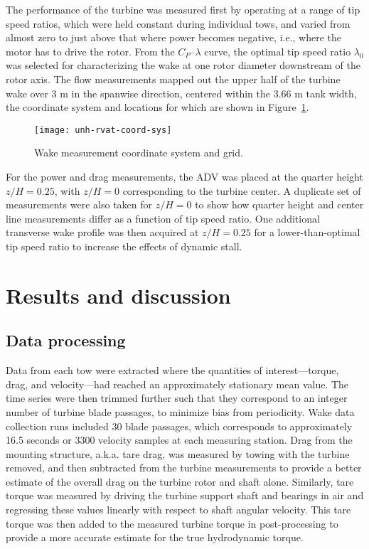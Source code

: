 
The performance of the turbine was measured first by operating at a range of tip
speed ratios, which were held constant during individual tows, and varied from
almost zero to just above that where power becomes negative, i.e., where the
motor has to drive the rotor. From the $C_P$--$\lambda$ curve, the optimal tip
speed ratio $\lambda_0$ was selected for characterizing the wake at one rotor
diameter downstream of the rotor axis. The flow measurements mapped out the
upper half of the turbine wake over 3 m in the spanwise direction, centered
within the 3.66 m tank width, the coordinate system and locations for which are
shown in Figure~\ref{fig:RVAT-baseline-wake-coordinates}.

\begin{figure}
    \centering

    \texttt{[image: unh-rvat-coord-sys]}

    \caption{Wake measurement coordinate system and grid.}

    \label{fig:RVAT-baseline-wake-coordinates}
\end{figure}

For the power and drag measurements, the ADV was placed at the quarter height
$z/H = 0.25$, with $z/H=0$ corresponding to the turbine center. A duplicate set
of measurements were also taken for $z/H = 0$ to show how quarter height and
center line measurements differ as a function of tip speed ratio. One additional
transverse wake profile was then acquired at $z/H = 0.25$ for a
lower-than-optimal tip speed ratio to increase the effects of dynamic stall.



\section{Results and discussion}

\subsection{Data processing}

Data from each tow were extracted where the quantities of interest---torque,
drag, and velocity---had reached an approximately stationary mean value. The
time series were then trimmed further such that they correspond to an integer
number of turbine blade passages, to minimize bias from periodicity. Wake data
collection runs included 30 blade passages, which corresponds to approximately
16.5 seconds or 3300 velocity samples at each measuring station. Drag from the
mounting structure, a.k.a. tare drag, was measured by towing with the turbine
removed, and then subtracted from the turbine measurements to provide a better
estimate of the overall drag on the turbine rotor and shaft alone. Similarly,
tare torque was measured by driving the turbine support shaft and bearings in
air and regressing these values linearly with respect to shaft angular velocity.
This tare torque was then added to the measured turbine torque in
post-processing to provide a more accurate estimate for the true hydrodynamic
torque.

